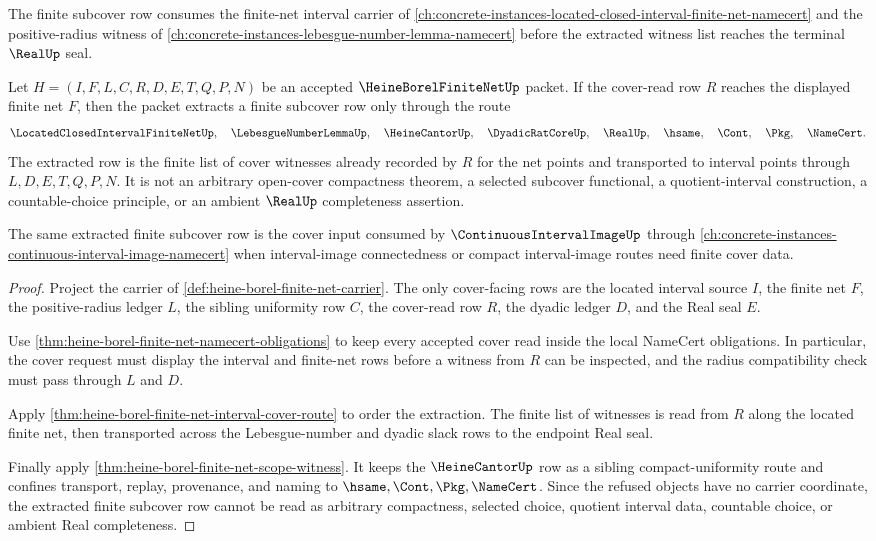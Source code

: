 \begin{theorem}
\label{thm:heine-borel-finite-net-subcover-extraction}
The finite subcover row consumes the finite-net interval carrier of \autoref{ch:concrete-instances-located-closed-interval-finite-net-namecert} and the positive-radius witness of \autoref{ch:concrete-instances-lebesgue-number-lemma-namecert} before the extracted witness list reaches the terminal $\RealUp$ seal.

Let $H=(I,F,L,C,R,D,E,T,Q,P,N)$ be an accepted $\HeineBorelFiniteNetUp$ packet. If the cover-read row $R$ reaches the displayed finite net $F$, then the packet extracts a finite subcover row only through the route
$$
\LocatedClosedIntervalFiniteNetUp,\quad
\LebesgueNumberLemmaUp,\quad
\HeineCantorUp,\quad
\DyadicRatCoreUp,\quad
\RealUp,\quad
\hsame,\quad
\Cont,\quad
\Pkg,\quad
\NameCert .
$$
The extracted row is the finite list of cover witnesses already recorded by $R$ for the net points and transported to interval points through $L,D,E,T,Q,P,N$. It is not an arbitrary open-cover compactness theorem, a selected subcover functional, a quotient-interval construction, a countable-choice principle, or an ambient $\RealUp$ completeness assertion.

The same extracted finite subcover row is the cover input consumed by $\ContinuousIntervalImageUp$ through \autoref{ch:concrete-instances-continuous-interval-image-namecert} when interval-image connectedness or compact interval-image routes need finite cover data.
\end{theorem}
\begin{proof}
Project the carrier of \autoref{def:heine-borel-finite-net-carrier}. The only cover-facing rows are the located interval source $I$, the finite net $F$, the positive-radius ledger $L$, the sibling uniformity row $C$, the cover-read row $R$, the dyadic ledger $D$, and the Real seal $E$.

Use \autoref{thm:heine-borel-finite-net-namecert-obligations} to keep every accepted cover read inside the local NameCert obligations. In particular, the cover request must display the interval and finite-net rows before a witness from $R$ can be inspected, and the radius compatibility check must pass through $L$ and $D$.

Apply \autoref{thm:heine-borel-finite-net-interval-cover-route} to order the extraction. The finite list of witnesses is read from $R$ along the located finite net, then transported across the Lebesgue-number and dyadic slack rows to the endpoint Real seal.

Finally apply \autoref{thm:heine-borel-finite-net-scope-witness}. It keeps the $\HeineCantorUp$ row as a sibling compact-uniformity route and confines transport, replay, provenance, and naming to $\hsame,\Cont,\Pkg,\NameCert$. Since the refused objects have no carrier coordinate, the extracted finite subcover row cannot be read as arbitrary compactness, selected choice, quotient interval data, countable choice, or ambient Real completeness.
\end{proof}


